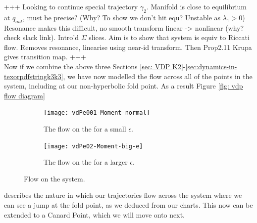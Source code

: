 +++ Looking to continue special trajectory $\gamma_2$. Manifold is close to equilibrium at $q_{out}$, must be precise? (Why? To show we don't hit equ? Unstable as $\lambda_1 >0$)  Resonance makes this difficult, no smooth transform linear -> nonlinear (why? check slack link). Intro'd $\Sigma$ slices. Aim is to show that system is equiv to Riccati flow. Removes resonance, linearise using near-id transform. Then Prop2.11 Krupa gives transition map. +++\\



Now if we combine the above three Sections \ref{sec: VDP K2}-\ref{sec:dynamics-in-texorpdfstringk3k3}, we have now modelled the flow across all of the points in the \vdp system, including at our non-hyperbolic fold point. As a result Figure \ref{fig: vdp flow diagram}
\begin{figure}[h!]\centering
		\begin{subfigure}[t]{0.45\textwidth}
			\centering
			\texttt{[image: vdPe001-Moment-normal]}
			\caption{The flow on the \vdp for a small $ \epsilon $.} \label{fig: vdp normal}
		\end{subfigure}
		\hfill
		\begin{subfigure}[t]{0.45\textwidth}
			\centering
			\texttt{[image: vdPe02-Moment-big-e]}
			\caption{The flow on the \vdp for a larger $ \epsilon $.} \label{fig: vdp big e}
		\end{subfigure}
		
	\caption{Flow on the \vdp system.}
	\label{fig: vdp flow diagram e}
\end{figure}
describes the nature in which our trajectories flow across the system where we can see a jump at the fold point, as we deduced from our charts. This now can be extended to a Canard Point, which we will move onto next. 
